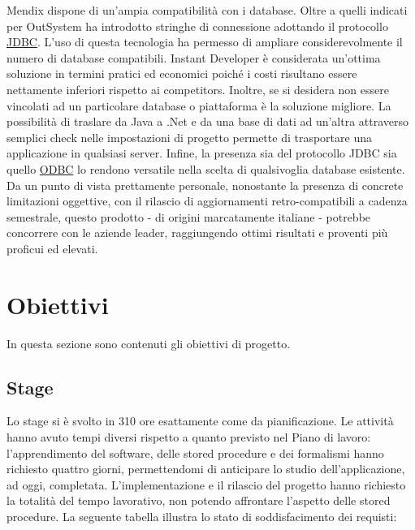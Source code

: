 Mendix dispone di un'ampia compatibilità con i database.  Oltre a quelli indicati per OutSystem ha introdotto stringhe di connessione adottando il protocollo \hyperref[JDBC]{JDBC}. L'uso di questa tecnologia ha permesso di ampliare considerevolmente il numero di database compatibili.
Instant Developer è considerata un'ottima soluzione in termini pratici ed economici poiché i costi risultano essere nettamente inferiori rispetto ai competitors. Inoltre, se si desidera non essere vincolati ad un particolare database o piattaforma è la soluzione migliore. La possibilità di traslare da Java a .Net e da una base di dati ad un'altra attraverso semplici check nelle impostazioni di progetto permette di trasportare una applicazione in qualsiasi server. Infine, la presenza sia del protocollo JDBC sia quello \hyperref[ODBC]{ODBC} lo rendono versatile nella scelta di qualsivoglia database esistente.
\\

Da un punto di vista prettamente personale, nonostante la presenza di concrete limitazioni oggettive, con il rilascio di aggiornamenti retro-compatibili a cadenza semestrale, questo prodotto - di origini marcatamente italiane - potrebbe concorrere con le aziende leader, raggiungendo ottimi risultati e proventi più proficui ed elevati.

\section{Obiettivi}
In questa sezione sono contenuti gli obiettivi di progetto.

\subsection{Stage}
Lo stage si è svolto in 310 ore esattamente come da pianificazione. Le attività hanno avuto tempi diversi rispetto a quanto previsto nel Piano di lavoro: l'apprendimento del software, delle stored procedure e dei formalismi hanno richiesto quattro giorni, permettendomi di anticipare lo studio dell'applicazione, ad oggi, completata.  L'implementazione e il rilascio del progetto hanno richiesto la totalità del tempo lavorativo, non potendo affrontare l'aspetto delle stored procedure. 
La seguente tabella illustra lo stato di soddisfacimento dei requisti:


